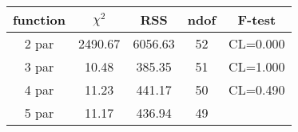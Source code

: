 \begin{tabular}{c|c|c|c|c}
function & $\chi^2$ & RSS & ndof & F-test \\
\hline
2 par & 2490.67 & 6056.63 & 52 & CL=0.000 \\
3 par & 10.48 & 385.35 & 51 & CL=1.000 \\
4 par & 11.23 & 441.17 & 50 & CL=0.490 \\
5 par & 11.17 & 436.94 & 49 & \\
\hline
\end{tabular}